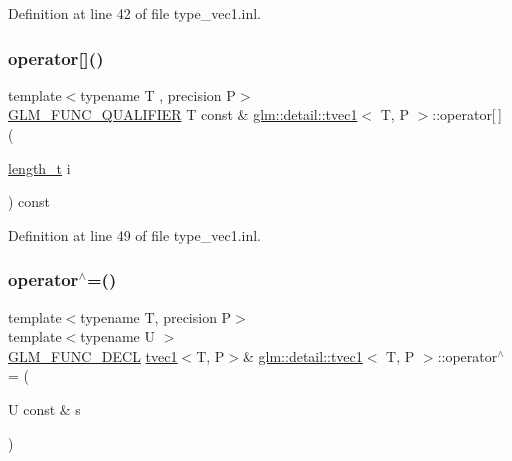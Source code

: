 Definition at line 42 of file type\+\_\+vec1.\+inl.

\mbox{\label{structglm_1_1detail_1_1tvec1_a219b839386858d9412d219bafc1b12ba}} 
\subsubsection{\texorpdfstring{operator[]()}{operator[]()}\hspace{0.1cm}{\footnotesize\ttfamily [2/2]}}
{\footnotesize\ttfamily template$<$typename T , precision P$>$ \\
\hyperlink{setup_8hpp_a33fdea6f91c5f834105f7415e2a64407}{G\+L\+M\+\_\+\+F\+U\+N\+C\+\_\+\+Q\+U\+A\+L\+I\+F\+I\+ER} T const  \& \hyperlink{structglm_1_1detail_1_1tvec1}{glm\+::detail\+::tvec1}$<$ T, P $>$\+::operator\mbox{[}$\,$\mbox{]} (\begin{DoxyParamCaption}\item[{\hyperlink{namespaceglm_a090a0de2260835bee80e71a702492ed9}{length\+\_\+t}}]{i }\end{DoxyParamCaption}) const}



Definition at line 49 of file type\+\_\+vec1.\+inl.

\mbox{\label{structglm_1_1detail_1_1tvec1_ae48766d1c02e2946f6185eaac15737ef}} 
\subsubsection{\texorpdfstring{operator$^\wedge$=()}{operator^=()}\hspace{0.1cm}{\footnotesize\ttfamily [1/4]}}
{\footnotesize\ttfamily template$<$typename T, precision P$>$ \\
template$<$typename U $>$ \\
\hyperlink{setup_8hpp_ab2d052de21a70539923e9bcbf6e83a51}{G\+L\+M\+\_\+\+F\+U\+N\+C\+\_\+\+D\+E\+CL} \hyperlink{structglm_1_1detail_1_1tvec1}{tvec1}$<$T, P$>$\& \hyperlink{structglm_1_1detail_1_1tvec1}{glm\+::detail\+::tvec1}$<$ T, P $>$\+::operator$^\wedge$= (\begin{DoxyParamCaption}\item[{U const \&}]{s }\end{DoxyParamCaption})}

